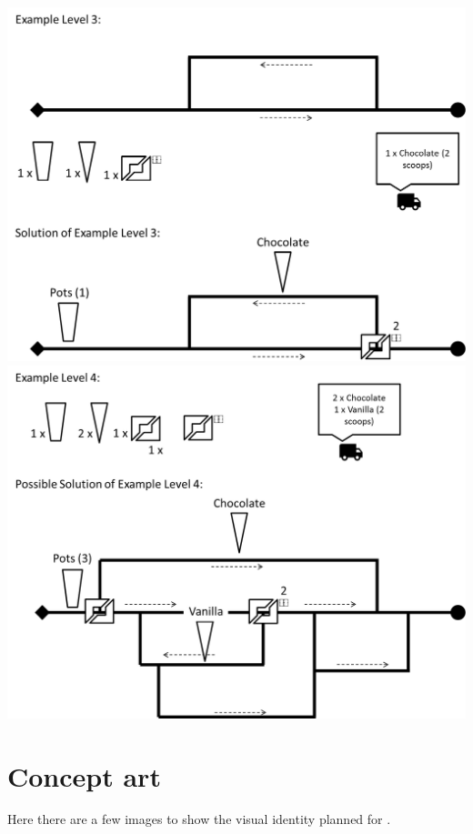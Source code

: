 \documentclass[a4paper]{scrartcl}
\begin{document}
        \includegraphics[width=\textwidth]{levels/03}
        \includegraphics[width=\textwidth]{levels/04}

\section{Concept art}
    Here there are a few images to show the visual identity planned for
    \gamename.
\end{document}
